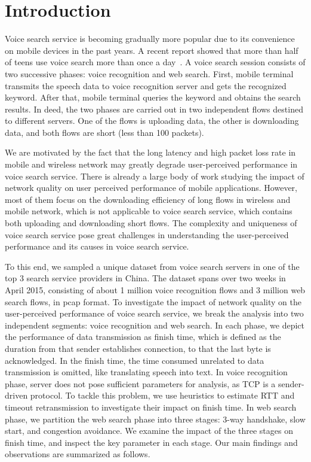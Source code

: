 
\section{Introduction}
\label{sec:intro}

Voice search service is becoming gradually more popular due to its convenience on mobile devices in the past years. A recent report showed that more than half of teens use voice search more than once a day~\cite{voice_search_report}. A voice search session consists of two successive phases: voice recognition and web search. First, mobile terminal transmits the speech data to voice recognition server and gets the recognized keyword. After that, mobile terminal queries the keyword and obtains the search results. In deed, the two phases are carried out in two independent flows destined to different servers. One of the flows is uploading data, the other is downloading data, and both flows are short (less than 100 packets).

We are motivated by the fact that the long latency and high packet loss rate in mobile and wireless network may greatly degrade user-perceived performance in voice search service. There is already a large body of work \cite{sommers2012cell,yu2014can,chen2012network,sharma2010goodput} studying the impact of network quality on user perceived performance of mobile applications. However, most of them focus on the downloading efficiency of long flows in wireless and mobile network, which is not applicable to voice search service, which contains both uploading and downloading short flows. The complexity and uniqueness of voice search service pose great challenges in understanding the user-perceived performance and its causes in voice search service.

To this end, we sampled a unique dataset from voice search servers in one of the top 3 search service providers in China. The dataset spans over two weeks in April 2015, consisting of about 1 million voice recognition flows and 3 million web search flows, in pcap format. To investigate the impact of network quality on the user-perceived performance of voice search service, we break the analysis into two independent segments: voice recognition and web search. In each phase, we depict the performance of data transmission as finish time, which is defined as the duration from that sender establishes connection, to that the last byte is acknowledged. In the finish time, the time consumed unrelated to data transmission is omitted, like translating speech into text. In voice recognition phase, server does not pose sufficient parameters for analysis, as TCP is a sender-driven protocol. To tackle this problem, we use heuristics to estimate RTT and timeout retransmission to investigate their impact on finish time. In web search phase, we partition the web search phase into three stages: 3-way handshake, slow start, and congestion avoidance. We examine the impact of the three stages on finish time, and inspect the key parameter in each stage. Our main findings and observations are summarized as follows.

